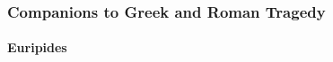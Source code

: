\documentclass[twocolumn]{article}
\begin{document}
\subsubsection{Companions to Greek and Roman Tragedy}





\paragraph{Euripides}
\end{document}
